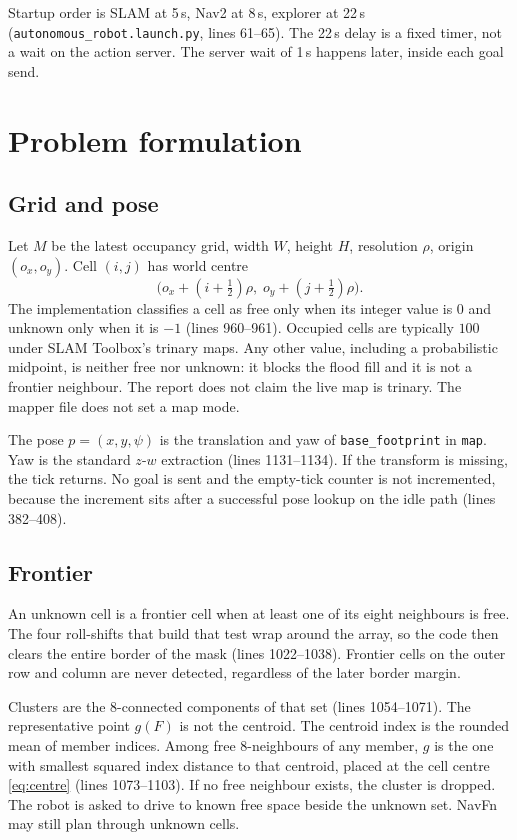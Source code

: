 \documentclass[11pt]{article}
\begin{document}
Startup order is SLAM at 5\,s, Nav2 at 8\,s, explorer at 22\,s (\texttt{autonomous\_robot.launch.py}, lines 61--65). The 22\,s delay is a fixed timer, not a wait on the action server. The server wait of 1\,s happens later, inside each goal send.

\section{Problem formulation}
\subsection{Grid and pose}
Let $M$ be the latest occupancy grid, width $W$, height $H$, resolution $\rho$, origin $(o_x,o_y)$. Cell $(i,j)$ has world centre
\begin{equation}
\big(o_x+(i+\tfrac12)\rho,\; o_y+(j+\tfrac12)\rho\big).
\label{eq:centre}
\end{equation}
The implementation classifies a cell as free only when its integer value is $0$ and unknown only when it is $-1$ (lines 960--961). Occupied cells are typically $100$ under SLAM Toolbox's trinary maps. Any other value, including a probabilistic midpoint, is neither free nor unknown: it blocks the flood fill and it is not a frontier neighbour. The report does not claim the live map is trinary. The mapper file does not set a map mode.

The pose $p=(x,y,\psi)$ is the translation and yaw of \texttt{base\_footprint} in \texttt{map}. Yaw is the standard $z$-$w$ extraction (lines 1131--1134). If the transform is missing, the tick returns. No goal is sent and the empty-tick counter is not incremented, because the increment sits after a successful pose lookup on the idle path (lines 382--408).

\subsection{Frontier}
An unknown cell is a frontier cell when at least one of its eight neighbours is free. The four roll-shifts that build that test wrap around the array, so the code then clears the entire border of the mask (lines 1022--1038). Frontier cells on the outer row and column are never detected, regardless of the later border margin.

Clusters are the 8-connected components of that set (lines 1054--1071). The representative point $g(F)$ is not the centroid. The centroid index is the rounded mean of member indices. Among free 8-neighbours of any member, $g$ is the one with smallest squared index distance to that centroid, placed at the cell centre \eqref{eq:centre} (lines 1073--1103). If no free neighbour exists, the cluster is dropped. The robot is asked to drive to known free space beside the unknown set. NavFn may still plan through unknown cells.
\end{document}
